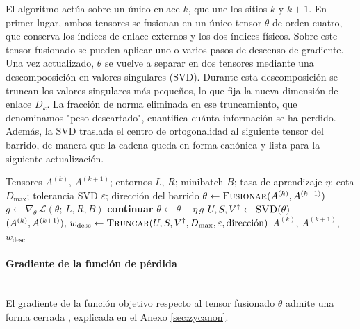 \documentclass[12pt]{extarticle}
\numberwithin{equation}{section}
\begin{document}
\begin{refsection}
El algoritmo actúa sobre un único enlace $k$, que une los sitios $k$ y $k+1$. En primer lugar, ambos tensores se fusionan en un único tensor $\theta$ de orden cuatro, que conserva los índices de enlace externos y los dos índices físicos. Sobre este tensor fusionado se pueden aplicar uno o varios pasos de descenso de gradiente. Una vez actualizado, $\theta$ se vuelve a separar en dos tensores mediante una descompoosición en valores singulares (SVD). Durante esta descomposición se truncan los valores singulares más pequeños, lo que fija la nueva dimensión de enlace $D_k$. La fracción de norma eliminada en ese truncamiento, que denominamos "peso descartado", cuantifica cuánta información se ha perdido. Además, la SVD traslada el centro de ortogonalidad al siguiente tensor del barrido, de manera que la cadena queda en forma canónica y lista para la siguiente actualización.

\begin{algorithm}[H]
\caption{Actualización local de dos sitios}
\label{alg:actualizacionlocal}
\begin{algorithmic}[1]
\Require Tensores $A^{(k)}$, $A^{(k+1)}$; entornos $L$, $R$; minibatch $B$; tasa de aprendizaje $\eta$; cota $D_{\max}$; tolerancia SVD $\varepsilon$; dirección del barrido
\State $\theta \gets \textsc{Fusionar}(A^{(k)}, A^{(k+1)})$ 
    \State $g \gets \nabla_{\theta}\,\mathcal{L}(\theta;\, L, R, B)$ 
        \State \textbf{continuar} 
    \EndIf
    \State $\theta \gets \theta - \eta\, g$
\EndFor
\State $U, S, V^{\dagger} \gets \textsc{SVD}(\theta)$
\State $(A^{(k)}, A^{(k+1)}),\, w_{\text{desc}} \gets \textsc{Truncar}(U, S, V^{\dagger}, D_{\max}, \varepsilon, \text{dirección})$ 
\State \Return $A^{(k)}$, $A^{(k+1)}$, $w_{\text{desc}}$
\end{algorithmic}
\end{algorithm}

\paragraph{Gradiente de la función de pérdida}
\mbox{}\\

El gradiente de la función objetivo respecto al tensor fusionado $\theta$ admite una forma cerrada \cite{han2018unsupervised}, explicada en el Anexo \ref{sec:zycanon}.


\end{refsection}
\end{document}
